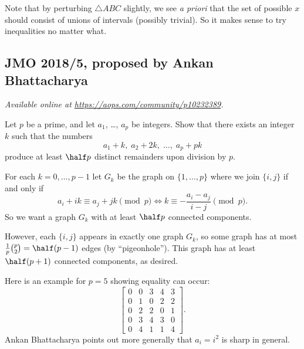 \documentclass[11pt]{scrartcl}
\begin{document}
\begin{remark*}
  Note that by perturbing $\triangle ABC$ slightly,
  we see \emph{a priori} that the set of possible $x$
  should consist of unions of intervals (possibly trivial).
  So it makes sense to try inequalities no matter what.
\end{remark*}
\pagebreak

\subsection{JMO 2018/5, proposed by Ankan Bhattacharya}
\textsl{Available online at \url{https://aops.com/community/p10232389}.}
\begin{mdframed}[style=mdpurplebox,frametitle={Problem statement}]
Let $p$ be a prime, and let $a_1$, \dots, $a_p$ be integers.
Show that there exists an integer $k$ such that the numbers
\[ a_1 + k, \; a_2 + 2k, \; \dots, \; a_p + pk \]
produce at least $\half p$ distinct remainders upon division by $p$.
\end{mdframed}
For each $k = 0, \dots, p-1$ let $G_k$ be the graph
on $\{1, \dots, p\}$ where we join $\{i,j\}$ if and only if
\[ a_i + ik \equiv a_j + jk \pmod p
  \iff k \equiv - \frac{a_i - a_j}{i-j} \pmod p. \]
So we want a graph $G_k$ with at least $\half p$ connected components.

However, each $\{i,j\}$ appears in exactly one graph $G_k$,
so some graph has at most $\frac 1p \binom p2 = \half(p-1)$ edges
(by ``pigeonhole'').
This graph has at least $\half(p+1)$ connected components, as desired.

\begin{remark*}
  Here is an example for $p=5$ showing equality can occur:
  \[
    \begin{bmatrix}
      0 & 0 & 3 & 4 & 3 \\
      0 & 1 & 0 & 2 & 2 \\
      0 & 2 & 2 & 0 & 1 \\
      0 & 3 & 4 & 3 & 0 \\
      0 & 4 & 1 & 1 & 4
    \end{bmatrix}.
  \]
  Ankan Bhattacharya points out more generally
  that $a_i = i^2$ is sharp in general.
\end{remark*}
\pagebreak
\end{document}
